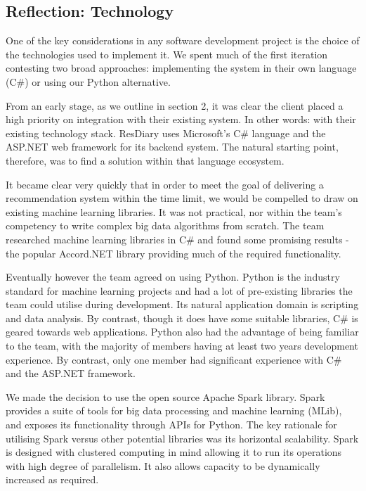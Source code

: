 \documentclass{l3proj}
\begin{document}
\subsection{Reflection: Technology}
\label{sec:pyreflection}


One of the key considerations in any software development project is the choice of the technologies used to implement it. We spent much of the first iteration contesting two broad approaches: implementing the system in their own language (C\#) or using our Python alternative.

From an early stage, as we outline in section 2, it was clear the client placed a high priority on integration with their existing system. In other words: with their existing technology stack. ResDiary uses Microsoft's C\# language and the ASP.NET web framework for its backend system. The natural starting point, therefore, was to find a solution within that language ecosystem. 

It became clear very quickly that in order to meet the goal of delivering a recommendation system within the time limit, we would be compelled to draw on existing machine learning libraries. It was not practical, nor within the team’s competency to write complex big data algorithms from scratch. The team researched machine learning libraries in C\# and found some promising results - the popular Accord.NET library providing much of the required functionality. 

Eventually however the team agreed on using Python. Python is the industry standard for machine learning projects and had a lot of pre-existing libraries the team could utilise during development. Its natural application domain is scripting and data analysis. By contrast, though it does have some suitable libraries, C\# is geared towards web applications. Python also had the advantage of being familiar to the team, with the majority of members having at least two years development experience. By contrast, only one member had significant experience with C\# and the ASP.NET framework.

We made the decision to use the open source Apache Spark library. Spark provides a suite of tools for big data processing and machine learning (MLib), and exposes its functionality through APIs for Python. The key rationale for utilising Spark versus other potential libraries was its horizontal scalability. Spark is designed with clustered computing in mind allowing it to run its operations with high degree of parallelism. It also allows capacity to be dynamically increased as required. 
\end{document}
